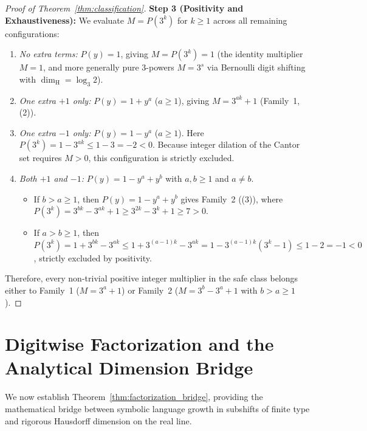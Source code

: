 \documentclass[11pt,reqno]{amsart}
\theoremstyle{plain}
\theoremstyle{definition}
\theoremstyle{remark}
\newcommand{\dimH}{\dim_{\mathrm{H}}}
\begin{document}
\begin{proof}[Proof of Theorem~\ref{thm:classification}]
\textbf{Step 3 (Positivity and Exhaustiveness):}
We evaluate $M = P(3^k)$ for $k \ge 1$ across all remaining configurations:
\begin{enumerate}
    \item \emph{No extra terms:} $P(y) = 1$, giving $M = P(3^k) = 1$ (the identity multiplier $M = 1$, and more generally pure $3$-powers $M = 3^s$ via Bernoulli digit shifting with $\dimH = \log_3 2$).
    \item \emph{One extra $+1$ only:} $P(y) = 1 + y^a$ ($a \ge 1$), giving $M = 3^{ak} + 1$ (Family~1, (2)).
    \item \emph{One extra $-1$ only:} $P(y) = 1 - y^a$ ($a \ge 1$). Here $P(3^k) = 1 - 3^{ak} \le 1 - 3 = -2 < 0$. Because integer dilation of the Cantor set requires $M > 0$, this configuration is strictly excluded.
    \item \emph{Both $+1$ and $-1$:} $P(y) = 1 - y^a + y^b$ with $a, b \ge 1$ and $a \ne b$.
    \begin{itemize}
        \item If $b > a \ge 1$, then $P(y) = 1 - y^a + y^b$ gives Family~2 ((3)), where $P(3^k) = 3^{bk} - 3^{ak} + 1 \ge 3^{2k} - 3^k + 1 \ge 7 > 0$.
        \item If $a > b \ge 1$, then $P(3^k) = 1 + 3^{bk} - 3^{ak} \le 1 + 3^{(a-1)k} - 3^{ak} = 1 - 3^{(a-1)k}(3^k - 1) \le 1 - 2 = -1 < 0$, strictly excluded by positivity.
    \end{itemize}
\end{enumerate}
Therefore, every non-trivial positive integer multiplier in the safe class belongs either to Family~1 ($M = 3^a + 1$) or Family~2 ($M = 3^b - 3^a + 1$ with $b > a \ge 1$).
\end{proof}

\section{Digitwise Factorization and the Analytical Dimension Bridge}\label{sec:bridge}

We now establish Theorem~\ref{thm:factorization_bridge}, providing the mathematical bridge between symbolic language growth in subshifts of finite type and rigorous Hausdorff dimension on the real line.
\end{document}
